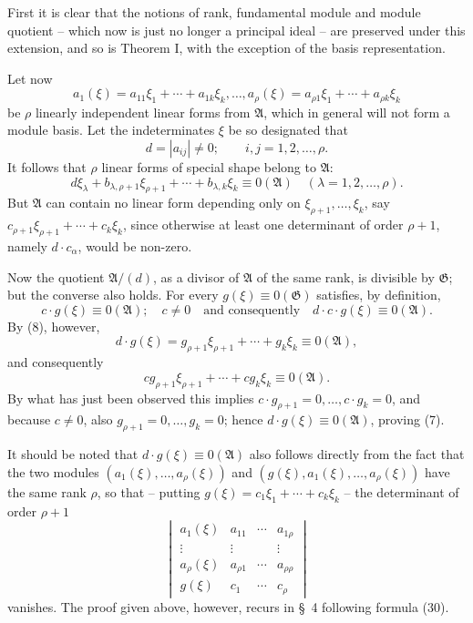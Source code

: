 \documentclass[11pt]{article}
\providecommand{\Amod}{\mathfrak A}
\providecommand{\Gmod}{\mathfrak G}
\providecommand{\zero}[1]{\equiv 0(#1)}
\providecommand{\Amod}{\mathfrak A}
\providecommand{\Gmod}{\mathfrak G}
\providecommand{\zero}[1]{\equiv 0\pmod{#1}}
\begin{document}
First it is clear that the notions of rank, fundamental module and module quotient -- which now is just no longer a principal ideal -- are preserved under this extension, and so is Theorem I, with the exception of the basis representation.

Let now
\[
 a_1(\xi)=a_{11}\xi_1+\cdots+a_{1k}\xi_k,\ldots,
 a_\rho(\xi)=a_{\rho1}\xi_1+\cdots+a_{\rho k}\xi_k
\]
be $\rho$ linearly independent linear forms from $\Amod$, which in general will not form a module basis. Let the indeterminates $\xi$ be so designated that
\[
 d=|a_{ij}|\ne0;\qquad i,j=1,2,\ldots,\rho.
\]
It follows that $\rho$ linear forms of special shape belong to $\Amod$:
\begin{equation}
 d\xi_\lambda+b_{\lambda,\rho+1}\xi_{\rho+1}+\cdots+b_{\lambda,k}\xi_k\zero{\Amod}
 \quad(\lambda=1,2,\ldots,\rho).
\tag{8}
\end{equation}
But $\Amod$ can contain no linear form depending only on $\xi_{\rho+1},\ldots,\xi_k$, say $c_{\rho+1}\xi_{\rho+1}+\cdots+c_k\xi_k$, since otherwise at least one determinant of order $\rho+1$, namely $d\cdot c_\alpha$, would be non-zero.

Now the quotient $\Amod/(d)$, as a divisor of $\Amod$ of the same rank, is divisible by $\Gmod$; but the converse also holds. For every $g(\xi)\zero{\Gmod}$ satisfies, by definition,
\[
 c\cdot g(\xi)\zero{\Amod};\quad c\ne0
 \quad\text{and consequently}\quad d\cdot c\cdot g(\xi)\zero{\Amod}.
\]
By (8), however,
\[
 d\cdot g(\xi)=g_{\rho+1}\xi_{\rho+1}+\cdots+g_k\xi_k\zero{\Amod},
\]
and consequently
\[
 c g_{\rho+1}\xi_{\rho+1}+\cdots+c g_k\xi_k\zero{\Amod}.
\]
By what has just been observed this implies $c\cdot g_{\rho+1}=0,\ldots,c\cdot g_k=0$, and because $c\ne0$, also $g_{\rho+1}=0,\ldots,g_k=0$; hence $d\cdot g(\xi)\zero{\Amod}$, proving (7).

It should be noted that $d\cdot g(\xi)\zero{\Amod}$ also follows directly from the fact that the two modules $(a_1(\xi),\ldots,a_\rho(\xi))$ and $(g(\xi),a_1(\xi),\ldots,a_\rho(\xi))$ have the same rank $\rho$, so that -- putting $g(\xi)=c_1\xi_1+\cdots+c_k\xi_k$ -- the determinant of order $\rho+1$
\[
\begin{vmatrix}
 a_1(\xi)&a_{11}&\cdots&a_{1\rho}\\
 \vdots&\vdots&&\vdots\\
 a_\rho(\xi)&a_{\rho1}&\cdots&a_{\rho\rho}\\
 g(\xi)&c_1&\cdots&c_\rho
\end{vmatrix}
\]
vanishes. The proof given above, however, recurs in §~4 following formula (30).
\end{document}
